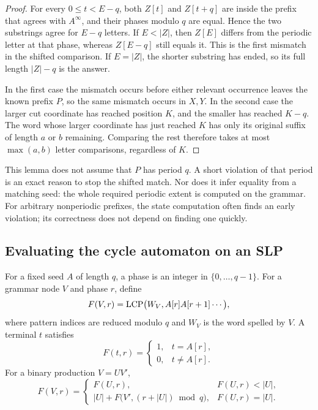 \begin{proof}
For every $0\le t<E-q$, both $Z[t]$ and $Z[t+q]$ are inside the prefix
that agrees with $A^\infty$, and their phases modulo $q$ are equal.
Hence the two substrings agree for $E-q$ letters. If $E<|Z|$, then
$Z[E]$ differs from the periodic letter at that phase, whereas
$Z[E-q]$ still equals it. This is the first mismatch in the shifted
comparison. If $E=|Z|$, the shorter substring has ended, so its full
length $|Z|-q$ is the answer.

In the first case the mismatch occurs before either relevant occurrence
leaves the known prefix $P$, so the same mismatch occurs in $X,Y$. In
the second case the larger cut coordinate has reached position $K$,
and the smaller has reached $K-q$. The word whose larger coordinate
has just reached $K$ has only its original suffix of length $a$ or $b$
remaining. Comparing the rest therefore takes at most $\max(a,b)$
letter comparisons, regardless of $K$.
\end{proof}

This lemma does not assume that $P$ has period $q$. A short violation
of that period is an exact reason to stop the shifted match. Nor does
it infer equality from a matching seed: the whole required periodic
extent is computed on the grammar. For arbitrary nonperiodic prefixes,
the state computation often finds an early violation; its correctness
does not depend on finding one quickly.

\subsection{Evaluating the cycle automaton on an SLP}

For a fixed seed $A$ of length $q$, a phase is an integer in
$\{0,\ldots,q-1\}$. For a grammar node $V$ and phase $r$, define
\[
 F(V,r)=\operatorname{LCP}\bigl(W_V, A[r]A[r+1]\cdots\bigr),
\]
where pattern indices are reduced modulo $q$ and $W_V$ is the word
spelled by $V$. A terminal $t$ satisfies
\[
 F(t,r)=\begin{cases}1,&t=A[r],\\0,&t\ne A[r].\end{cases}
\]
For a binary production $V=UV'$,
\begin{equation}
 F(V,r)=
 \begin{cases}
 F(U,r),&F(U,r)<|U|,\\[2pt]
 |U|+F\bigl(V',(r+|U|)\bmod q\bigr),&F(U,r)=|U|.
 \end{cases}
 \label{eq:cycle-automaton-prefix}
\end{equation}

